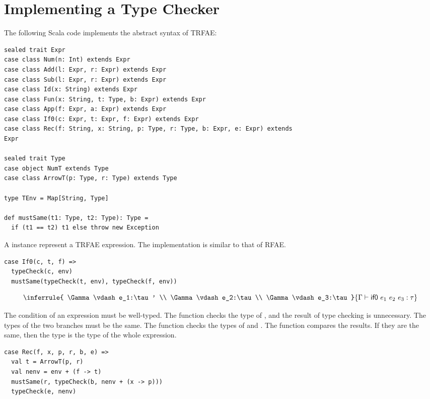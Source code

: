 \section{Implementing a Type Checker}

The following Scala code implements the abstract syntax of TRFAE:

\begin{verbatim}
sealed trait Expr
case class Num(n: Int) extends Expr
case class Add(l: Expr, r: Expr) extends Expr
case class Sub(l: Expr, r: Expr) extends Expr
case class Id(x: String) extends Expr
case class Fun(x: String, t: Type, b: Expr) extends Expr
case class App(f: Expr, a: Expr) extends Expr
case class If0(c: Expr, t: Expr, f: Expr) extends Expr
case class Rec(f: String, x: String, p: Type, r: Type, b: Expr, e: Expr) extends
Expr

sealed trait Type
case object NumT extends Type
case class ArrowT(p: Type, r: Type) extends Type

type TEnv = Map[String, Type]

def mustSame(t1: Type, t2: Type): Type =
  if (t1 == t2) t1 else throw new Exception
\end{verbatim}

A  instance represent a TRFAE expression. The implementation is
similar to that of RFAE.

\begin{verbatim}
case If0(c, t, f) =>
  typeCheck(c, env)
  mustSame(typeCheck(t, env), typeCheck(f, env))
\end{verbatim}

\[
\inferrule
{ \Gamma\vdash e_1:\tau' \\
  \Gamma\vdash e_2:\tau \\
  \Gamma\vdash e_3:\tau }
{ \Gamma\vdash\textsf{if0}\ e_1\ e_2\ e_3:\tau}
\]

The condition of an expression must be well-typed. The  function
checks the type of , and the result of type checking is unnecessary. The
types of the two branches must be the same. The  function checks
the types of  and . The  function compares the
results. If they are the same, then the type is the type of the whole expression.

\begin{verbatim}
case Rec(f, x, p, r, b, e) =>
  val t = ArrowT(p, r)
  val nenv = env + (f -> t)
  mustSame(r, typeCheck(b, nenv + (x -> p)))
  typeCheck(e, nenv)
\end{verbatim}

